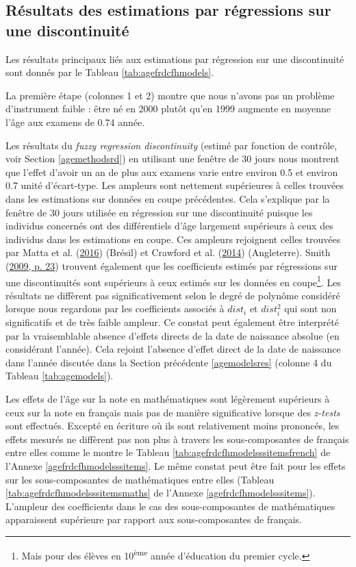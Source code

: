 \documentclass[
]{book}
\begin{document}
\hypertarget{agefrdcfhmodelsres}{%
\subsection{Résultats des estimations par régressions sur une discontinuité}\label{agefrdcfhmodelsres}}

Les résultats principaux liés aux estimations par régression sur une discontinuité sont donnés par le Tableau \ref{tab:agefrdcfhmodels}.

\quad La première étape (colonnes 1 et 2) montre que nous n'avons pas un problème d'instrument faible : être né en 2000 plutôt qu'en 1999 augmente en moyenne l'âge aux examens de 0.74 année.

\quad Les résultats du \emph{fuzzy regression discontinuity} (estimé par fonction de contrôle, voir Section \ref{agemethodsrd}) en utilisant une fenêtre de 30 jours nous montrent que l'effet d'avoir un an de plus aux examens varie entre environ 0.5 et environ 0.7 unité d'écart-type. Les ampleurs sont nettement supérieures à celles trouvées dans les estimations sur données en coupe précédentes. Cela s'explique par la fenêtre de 30 jours utilisée en régression sur une discontinuité puisque les individus concernés ont des différentiels d'âge largement supérieurs à ceux des individus dans les estimations en coupe. Ces ampleurs rejoignent celles trouvées par Matta et al. (\protect\hyperlink{ref-MAT:eal:16}{2016}) (Brésil) et Crawford et al. (\protect\hyperlink{ref-CRA:eal:14}{2014}) (Angleterre). Smith (\protect\hyperlink{ref-SMI:09}{2009, p. 23}) trouvent également que les coefficients estimés par régressions sur une discontinuités sont supérieurs à ceux estimés sur les données en coupe\footnote{Mais pour des élèves en 10\textsuperscript{ème} année d'éducation du premier cycle.}. Les résultats ne diffèrent pas significativement selon le degré de polynôme considéré lorsque nous regardons par les coefficients associés à \(dist_i\) et \(dist_i^ 2\) qui sont non significatifs et de très faible ampleur. Ce constat peut également être interprété par la vraisemblable absence d'effets directs de la date de naissance absolue (en considérant l'année). Cela rejoint l'absence d'effet direct de la date de naissance dans l'année discutée dans la Section précédente \ref{agemodelsres} (colonne 4 du Tableau \ref{tab:agemodels}).

\quad Les effets de l'âge sur la note en mathématiques sont légèrement supérieurs à ceux sur la note en français mais pas de manière significative lorsque des \emph{z-tests} sont effectués.
Excepté en écriture où ils sont relativement moins prononcés, les effets mesurés ne diffèrent pas non plus à travers les sous-composantes de français entre elles comme le montre le Tableau \ref{tab:agefrdcfhmodelsssitemsfrench} de l'Annexe \ref{agefrdcfhmodelsssitems}. Le même constat peut être fait pour les effets sur les sous-composantes de mathématiques entre elles (Tableau \ref{tab:agefrdcfhmodelsssitemsmaths} de l'Annexe \ref{agefrdcfhmodelsssitems}). L'ampleur des coefficients dans le cas des sous-composantes de mathématiques apparaissent supérieure par rapport aux sous-composantes de français.
\end{document}
